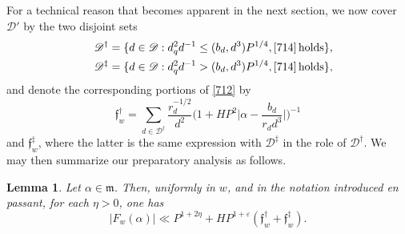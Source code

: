 \documentclass[reqno]{amsart}
\newcommand\eps{\varepsilon}
\newtheorem{lemma}[thm]{Lemma}
\numberwithin{equation}{section}
\begin{document}
For a technical reason that becomes apparent in the next section, we now cover $\mathscr{D}'$ by the two disjoint sets
\begin{equation}\label{714a}\begin{split}\mathscr{D}^\dagger = \{d\in\mathscr{D}: d_q^2d^{-1} \leq (b_d,d^3)P^{1/4}, \eqref{714} \,\text{holds}\},\\
\quad \mathscr{D}^\ddagger = \{d\in\mathscr{D}: d_q^2d^{-1} > (b_d,d^3)P^{1/4},\eqref{714}\,\text{holds}\},
\end{split}\end{equation}
and denote the corresponding portions of \eqref{712} by
\begin{equation}\label{714b}\mathfrak f_w^\dagger = \sum_{d \in \mathscr{D}^\dagger} \frac{r_d^{-1/2} }{d^2} \Big(1 + HP^2 \Big|\alpha - \frac{b_d}{r_d d^3}\Big|\Big)^{-1}\end{equation}
and $\mathfrak f_w^\ddagger$, where the latter is the same expression with $\mathscr{D}^\ddagger$ in the role of $\mathscr{D}^\dagger$. We may then summarize our preparatory analysis as follows.

\begin{lemma}\label{L73}
Let $\alpha \in \mathfrak m$. Then, uniformly in $w$, and in the notation introduced \emph{en passant},  for each \(\eta>0\), one has
$$|F_w(\alpha)| \ll P^{1 + 2\eta} + HP^{1 + \eps} \left(\mathfrak f_w^\dagger + \mathfrak f_w^\ddagger\right).$$
\end{lemma}
\end{document}
